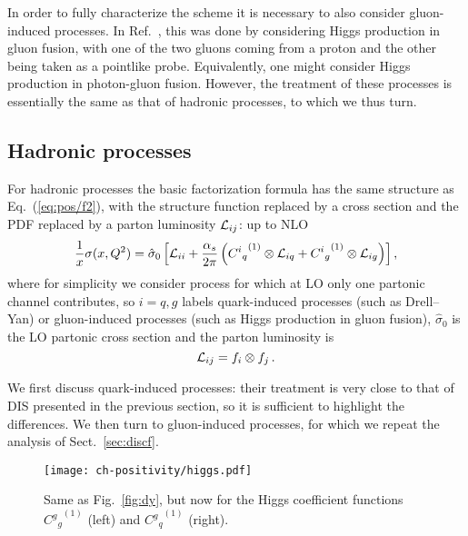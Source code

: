 In order to fully characterize the scheme it is necessary to also
consider gluon-induced processes. In Ref.~\cite{Altarelli:1998gn},
this was done by considering Higgs production in gluon fusion, with
one of the two gluons coming from a proton and the other being taken
as a pointlike probe. Equivalently, one might consider Higgs production in
photon-gluon fusion. However, the treatment of these
processes is essentially the same as that of hadronic processes, to
which we thus turn.


\subsection{Hadronic processes}
\label{sec:hadr}
For hadronic processes the basic factorization formula has the same structure
as Eq.~(\ref{eq:pos/f2}), with the structure function replaced by a cross section
and the PDF replaced by a parton luminosity ${\cal L}_{ij}$: up to NLO
\begin{equation}
 \frac{1}{x} \sigma(x,Q^2)= \hat \sigma_0 \left[  {\cal L}_{ii}
   +\frac{\alpha_s}{2\pi}\left( {{C^i}_q}^{(1)} \otimes {\cal L}_{iq} +
 {{C^i}_g}^{(1)} \otimes {\cal L}_{ig}\right) \right],\label{eq:pos/hadfact}
\end{equation}
where for simplicity we consider process for which at LO only one
partonic channel contributes, so
$i=q,g$ labels quark-induced processes (such as Drell--Yan) or
gluon-induced processes (such as Higgs production in gluon fusion),
$\hat{\sigma}_0$ is the LO partonic cross section and
the parton luminosity is 
\begin{equation}\label{eq:pos/lumi}
 {\cal L}_{ij}= f_i\otimes f_j\,.
\end{equation}

We first discuss quark-induced processes: their treatment is very close to that
of DIS  presented in the previous section, so it is sufficient to highlight the
differences.
We then turn to gluon-induced processes, for which we repeat the analysis of
Sect.~\ref{sec:discf}.


\begin{figure}[t]
  \begin{center}
    \texttt{[image: ch-positivity/higgs.pdf]}
    \caption{\small Same as Fig.~\ref{fig:dy}, but now for the Higgs
      coefficient functions  ${{{C^g}_g}^{(1)}}$ (left) and
      ${{{C^g}_q}^{(1)}}$ (right).
    \label{fig:higgs} }
  \end{center}
\end{figure}


